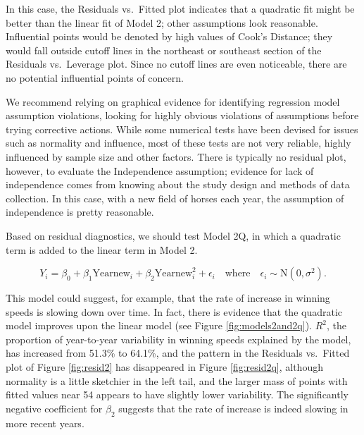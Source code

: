 \documentclass[
]{krantz}
\begin{document}
In this case, the Residuals vs.~Fitted plot indicates that a quadratic fit might be better than the linear fit of Model 2; other assumptions look reasonable. Influential points would be denoted by high values of Cook's Distance; they would fall outside cutoff lines in the northeast or southeast section of the Residuals vs.~Leverage plot. Since no cutoff lines are even noticeable, there are no potential influential points of concern.

We recommend relying on graphical evidence for identifying regression model assumption violations, looking for highly obvious violations of assumptions before trying corrective actions. While some numerical tests have been devised for issues such as normality and influence, most of these tests are not very reliable, highly influenced by sample size and other factors. There is typically no residual plot, however, to evaluate the Independence assumption; evidence for lack of independence comes from knowing about the study design and methods of data collection. In this case, with a new field of horses each year, the assumption of independence is pretty reasonable.

Based on residual diagnostics, we should test Model 2Q, in which a quadratic term is added to the linear term in Model 2.

\begin{equation*}
Y_{i}=\beta_{0}+\beta_{1}\textrm{Yearnew}_{i}+\beta_{2}\textrm{Yearnew}^2_{i}+\epsilon_{i}\quad \textrm{where}\quad \epsilon_{i}\sim \textrm{N}(0,\sigma^2).
\end{equation*}

This model could suggest, for example, that the rate of increase in winning speeds is slowing down over time. In fact, there is evidence that the quadratic model improves upon the linear model (see Figure \ref{fig:models2and2q}). \(R^2\),  the proportion of year-to-year variability in winning speeds explained by the model, has increased from 51.3\% to 64.1\%, and the pattern in the Residuals vs.~Fitted plot of Figure \ref{fig:resid2} has disappeared in Figure \ref{fig:resid2q}, although normality is a little sketchier in the left tail, and the larger mass of points with fitted values near 54 appears to have slightly lower variability. The significantly negative coefficient for \(\beta_{2}\) suggests that the rate of increase is indeed slowing in more recent years.
\end{document}

